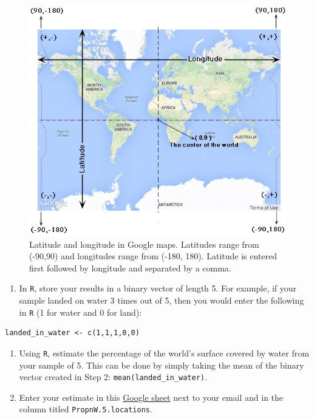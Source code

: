 \documentclass[letterpaper,10pt,twoside,]{pinp}
\providecommand{\tightlist}{%
  \setlength{\itemsep}{0pt}\setlength{\parskip}{0pt}}
\begin{document}
\begin{figure}[H]
  \begin{center}
    \includegraphics[scale=0.75]{lat-long.png} 
  \end{center}
  \caption{Latitude and longitude in Google maps. Latitudes range from (-90,90) and longitudes range from (-180, 180). Latitude is entered first followed by longitude and separated by a comma.}\label{maps}
\end{figure}

\begin{enumerate}
\def\labelenumi{\arabic{enumi}.}
\setcounter{enumi}{1}
\tightlist
\item
  In \texttt{R}, store your results in a binary vector of length 5. For
  example, if your sample landed on water 3 times out of 5, then you
  would enter the following in \texttt{R} (1 for water and 0 for land):
\end{enumerate}

\begin{ShadedResult}
\begin{verbatim}
landed_in_water <- c(1,1,1,0,0)
\end{verbatim}
\end{ShadedResult}

\begin{enumerate}
\def\labelenumi{\arabic{enumi}.}
\setcounter{enumi}{2}
\item
  Using \texttt{R}, estimate the percentage of the world's surface
  covered by water from your sample of 5. This can be done by simply
  taking the mean of the binary vector created in Step 2:
  \texttt{mean(landed\_in\_water)}.
\item
  Enter your estimate in this
  \href{https://docs.google.com/spreadsheets/d/1Mnxeq9nQcTdQycZ7S_62fYFiNC5_a3fibsyodzfwO58/edit?usp=sharing}{Google
  sheet} next to your email and in the column titled
  \texttt{PropnW.5.locations}.
\end{enumerate}
\end{document}
